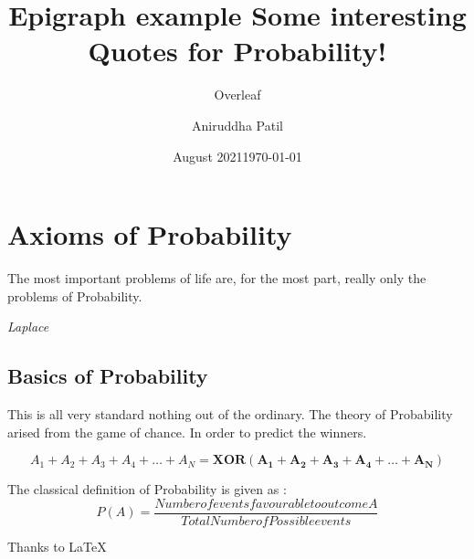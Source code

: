 \documentclass[11pt]{book}
\title{Epigraph example}
\author{Overleaf}
\date{August 2021}
\title{ \textbf{Some interesting Quotes for Probability!}}
\author{ Aniruddha Patil }
\date{\today}
\begin{document}
\frontmatter
\mainmatter
\maketitle










\chapter{Axioms of Probability}
\epigraph{The most important problems of life are, for the most part, really only the problems of Probability.}{\textit{Laplace}}

\section{Basics of Probability}
 {This is all very standard nothing out of the ordinary. The theory of Probability arised from the game of chance. In order to predict the winners.}

$$A_1 + A_2 + A_3 + A_4 + \ldots + A_N = \mathbf{XOR(A_1+A_2+A_3+A_4+\ldots+A_N)}$$

{{\hspace*{-0.5cm}}The classical definition of Probability is given as : }
$$P(A) = \frac{Number of events favourable to outcome A}{Total Number of Possible events}$$

{Thanks to \LaTeX}



\end{document}
